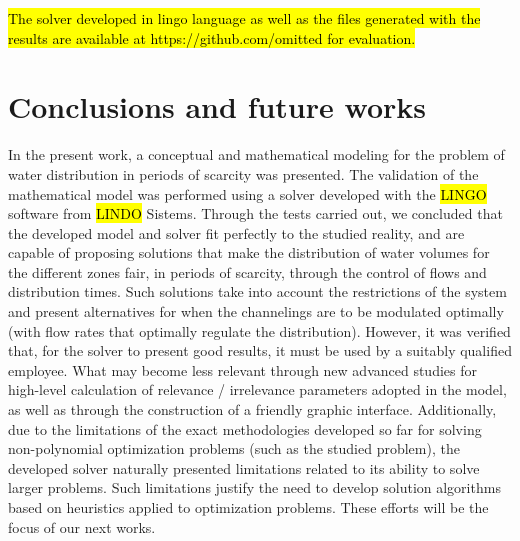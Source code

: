 \documentclass{singlecol}
\theoremstyle{TH}{
\newtheorem{lemma}{Lemma}
\newtheorem{theorem}[lemma]{Theorem}
\newtheorem{corrolary}[lemma]{Corrolary}
\newtheorem{conjecture}[lemma]{Conjecture}
\newtheorem{proposition}[lemma]{Proposition}
\newtheorem{claim}[lemma]{Claim}
\newtheorem{stheorem}[lemma]{Wrong Theorem}
\newtheorem{algorithm}{Algorithm}
}
\theoremstyle{THrm}{
\newtheorem{definition}{Definition}[section]
\newtheorem{question}{Question}[section]
\newtheorem{remark}{Remark}
\newtheorem{scheme}{Scheme}
}
\theoremstyle{THhit}{
\newtheorem{case}{Case}[section]
}
\begin{document}
\hl{The solver developed in lingo language as well as the files generated with the results are available at https://github.com/omitted for evaluation.}

\section{Conclusions and future works}
\label{sec:conclusions}

In the present work, a conceptual and mathematical modeling for the problem of water distribution in periods of scarcity was presented. The validation of the mathematical model was performed using a solver developed with the \hl{LINGO} software from \hl{LINDO} Sistems. Through the tests carried out, we concluded that the developed model and solver fit perfectly to the studied reality, and are capable of proposing solutions that make the distribution of water volumes for the different zones fair, in periods of scarcity, through the control of flows and distribution times. Such solutions take into account the restrictions of the system and present alternatives for when the channelings are to be modulated optimally (with flow rates that optimally regulate the distribution). However, it was verified that, for the solver to present good results, it must be used by a suitably qualified employee. What may become less relevant through new advanced studies for high-level calculation of relevance / irrelevance parameters adopted in the model, as well as through the construction of a friendly graphic interface.  Additionally, due to the limitations of the exact methodologies developed so far for solving non-polynomial optimization problems (such as the studied problem), the developed solver naturally presented limitations related to its ability to solve larger problems. Such limitations justify the need to develop solution algorithms based on heuristics applied to optimization problems. These efforts will be the focus of our next works.


\end{document}

